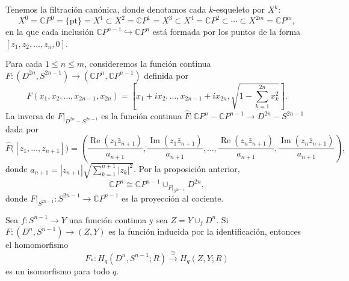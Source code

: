 \begin{dem}
Tenemos la filtración canónica, donde denotamos cada $k$-esqueleto por $X^k$:
\[
X^0 = \mathbb{C}P^0 = \{\mathrm{pt}\} = X^1 \subset X^2 = \mathbb{C}P^1 = X^3 \subset X^4 = \mathbb{C}P^2 \subset \cdots \subset X^{2m} = \mathbb{C}P^m,
\]
en la que cada inclusión $\mathbb{C}P^{n-1} \hookrightarrow \mathbb{C}P^n$ está formada por los puntos de la forma $[z_1, z_2, \dots, z_n, 0]$.

Para cada $1 \leq n \leq m$, consideremos la función continua $F \colon (D^{2n}, S^{2n-1}) \to (\mathbb{C}P^n, \mathbb{C}P^{n-1})$ definida por
\[
F(x_1, x_2, \dots, x_{2n-1}, x_{2n}) =
\left[
x_1 + i x_2, \dots, x_{2n-1} + i x_{2n}, \sqrt{1 - \sum_{k=1}^{2n} x_k^2}
\right].
\]
La inversa de $F|_{D^{2n} - S^{2n-1}}$ es la función continua $\hat{F} \colon \mathbb{C}P^n - \mathbb{C}P^{n-1} \to D^{2n} - S^{2n-1}$ dada por
\[
\hat{F}\bigl([z_1, \dots, z_{n+1}]\bigr) =
\left(
\frac{\operatorname{Re}(z_1 \bar{z}_{n+1})}{a_{n+1}},
\frac{\operatorname{Im}(z_1 \bar{z}_{n+1})}{a_{n+1}}, \dots,
\frac{\operatorname{Re}(z_n \bar{z}_{n+1})}{a_{n+1}},
\frac{\operatorname{Im}(z_n \bar{z}_{n+1})}{a_{n+1}}
\right),
\]
donde $a_{n+1} = |z_{n+1}| \sqrt{\sum_{k=1}^{n+1} |z_k|^2}$. Por la proposición anterior,
\[
\mathbb{C}P^n \cong \mathbb{C}P^{n-1} \cup_{F|_{S^{2n-1}}} D^{2n},
\]
donde $F|_{S^{2n-1}} \colon S^{2n-1} \to \mathbb{C}P^{n-1}$ es la proyección al cociente.
\end{dem}

\begin{prop}
Sea $f \colon S^{n-1} \to Y$ una función continua y sea $Z = Y \cup_f D^n$. Si $F \colon (D^n, S^{n-1}) \to (Z, Y)$ es la función inducida por la identificación, entonces el homomorfismo
\[
F_* \colon H_q(D^n, S^{n-1}; R) \xrightarrow{\;\cong\;} H_q(Z, Y; R)
\]
es un isomorfismo para todo $q$.
\end{prop}

